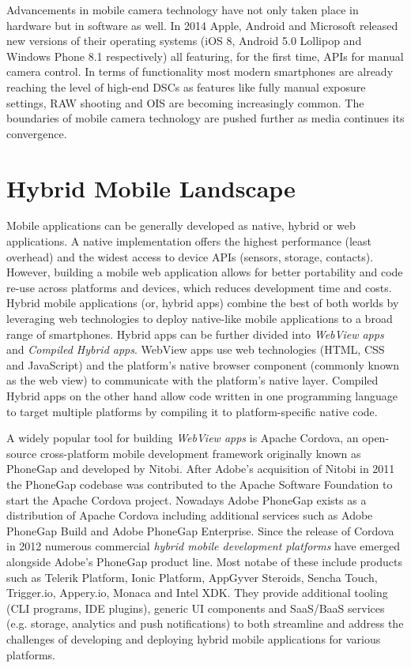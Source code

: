 \documentclass[thesis.tex]{subfiles}
\begin{document}
Advancements in mobile camera technology have not only taken place in hardware but in software as well. In 2014 Apple, Android and Microsoft released new versions of their operating systems (iOS 8, Android 5.0 Lollipop and Windows Phone 8.1 respectively) all featuring, for the first time, APIs for manual camera control. In terms of functionality most modern smartphones are already reaching the level of high-end DSCs as features like fully manual exposure settings, RAW shooting and OIS are becoming increasingly common. The boundaries of mobile camera technology are pushed further as media continues its convergence.

\section{Hybrid Mobile Landscape}

Mobile applications can be generally developed as native, hybrid or web applications. A native implementation offers the highest performance (least overhead) and the widest access to device APIs (sensors, storage, contacts). However, building a mobile web application allows for better portability and code re-use across platforms and devices, which reduces development time and costs. Hybrid mobile applications (or, hybrid apps) combine the best of both worlds by leveraging web technologies to deploy native-like mobile applications to a broad range of smartphones. Hybrid apps can be further divided into \textit{WebView apps} and \textit{Compiled Hybrid apps}. WebView apps use web technologies (HTML, CSS and JavaScript) and the platform's native browser component (commonly known as the web view) to communicate with the platform's native layer. Compiled Hybrid apps on the other hand allow code written in one programming language to target multiple platforms by compiling it to platform-specific native code.

A widely popular tool for building \textit{WebView apps} is Apache Cordova, an open-source cross-platform mobile development framework originally known as PhoneGap and developed by Nitobi. After Adobe's acquisition of Nitobi in 2011 the PhoneGap codebase was contributed to the Apache Software Foundation to start the Apache Cordova project. Nowadays Adobe PhoneGap exists as a distribution of Apache Cordova including additional services such as Adobe PhoneGap Build and Adobe PhoneGap Enterprise. Since the release of Cordova in 2012 numerous commercial \textit{hybrid mobile development platforms} have emerged alongside Adobe's PhoneGap product line. Most notabe of these include products such as Telerik Platform, Ionic Platform, AppGyver Steroids, Sencha Touch, Trigger.io, Appery.io, Monaca and Intel XDK. They provide additional tooling (CLI programs, IDE plugins), generic UI components and SaaS/BaaS services (e.g. storage, analytics and push notifications) to both streamline and address the challenges of developing and deploying hybrid mobile applications for various platforms.
\end{document}
